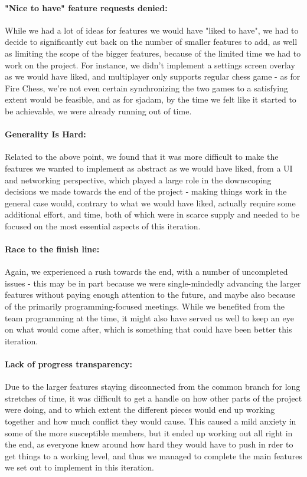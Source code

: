\documentclass{article}
\begin{document}
\paragraph{"Nice to have" feature requests denied:} While we had a lot of ideas for features we would have "liked to have", we had to decide to significantly cut back on the number of smaller features to add, as well as limiting the scope of the bigger features, because of the limited time we had to work on the project. For instance, we didn't implement a settings screen overlay as we would have liked, and multiplayer only supports regular chess game - as for Fire Chess, we're not even certain synchronizing the two games to a satisfying extent would be feasible, and as for sjadam, by the time we felt like it started to be achievable, we were already running out of time.

\paragraph{Generality Is Hard\texttrademark:} Related to the above point, we found that it was more difficult to make the features we wanted to implement as abstract as we would have liked, from a UI and networking perspective, which played a large role in the downscoping decisions we made towards the end of the project - making things work in the general case would, contrary to what we would have liked, actually require some additional effort, and time, both of which were in scarce supply and needed to be focused on the most essential aspects of this iteration.

\paragraph{Race to the finish line:} Again, we experienced a rush towards the end, with a number of uncompleted issues - this may be in part because we were single-mindedly advancing the larger features without paying enough attention to the future, and maybe also because of the primarily programming-focused meetings. While we benefited from the team programming at the time, it might also have served us well to keep an eye on what would come after, which is something that could have been better this iteration.

\paragraph{Lack of progress transparency:} Due to the larger features staying disconnected from the common branch for long stretches of time, it was difficult to get a handle on how other parts of the project were doing, and to which extent the different pieces would end up working together and how much conflict they would cause. This caused a mild anxiety in some of the more susceptible members, but it ended up working out all right in the end, as everyone knew around how hard they would have to push in rder to get things to a working level, and thus we managed to complete the main features we set out to implement in this iteration.
\end{document}
